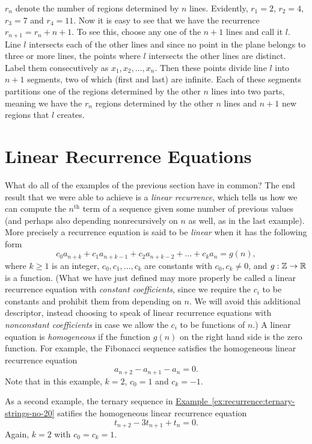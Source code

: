 $r_n$ denote the number of regions determined by $n$ lines.  Evidently,
$r_1=2$, $r_2=4$, $r_3=7$ and $r_4=11$.  Now it is easy to see that
we have the recurrence $r_{n+1} = r_n+n+1$.  To see this, choose any
one of the $n+1$ lines and call it $l$.  Line $l$ 
intersects each of the other lines and since no point in the plane
belongs to three or more lines, the points where $l$ intersects
the other lines are distinct.  Label them consecutively as
$x_1,x_2,\dots,x_n$.  Then these points divide line $l$ into
$n+1$ segments, two of which (first and last) are infinite.  Each of
these segments partitions one of the regions determined by the other
$n$ lines into two parts, meaning we have the $r_n$ regions determined
by the other $n$ lines and $n+1$ new regions that $l$ creates.

\section{Linear Recurrence Equations}\label{s:recurrence:linear}

What do all of the examples of the previous section have in common?
The end result that we were able to achieve is a \emph{linear
  recurrence}, which tells us how we can compute the $n^\text{th}$
term of a sequence given some number of previous values (and perhaps
also depending nonrecursively on $n$ as well, as in the last example).
More precisely a recurrence equation is said to be \textit{linear}
when it has the following form
\[
c_0a_{n+k}+ c_1a_{n+k-1} + c_2a_{n+k-2} + \dots+c_ka_{n} = g(n),
\] 
where $k\ge1$ is an integer, $c_0,c_1,\dots,c_k$ are constants with
$c_0,c_k\neq0$, and
$g:\mathbb{Z}\rightarrow\mathbb{R}$ is a function. (What we have just defined
may more properly be called a linear recurrence equation with
\emph{constant coefficients}, since we require the $c_i$ to be
constants and prohibit them from depending on $n$. We will avoid this
additional descriptor, instead choosing to speak of linear recurrence
equations with \emph{nonconstant coefficients} in case we allow the
$c_i$ to be functions of $n$.) A linear equation is
\textit{homogeneous} if the function $g(n)$ on the right hand side
is the zero function.  For example, the Fibonacci sequence satisfies
the homogeneous linear recurrence equation
\[
a_{n+2} - a_{n+1} - a_n = 0.
\]
Note that in this example, $k=2$, $c_0=1$ and $c_k=-1$.

As a second example, the ternary sequence in
\hyperref[ex:recurrence:ternary-strings-no-20]{Example~\ref*{ex:recurrence:ternary-strings-no-20}}
  satifies the  homogeneous linear recurrence equation
\[
t_{n+2} - 3t_{n+1} + t_n = 0.
\]
Again, $k=2$ with $c_0=c_k=1$.


